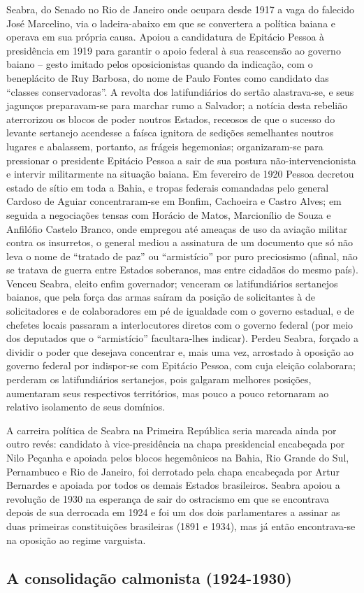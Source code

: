 Seabra, do Senado no Rio de Janeiro onde ocupara desde 1917 a vaga do falecido José Marcelino, via o ladeira-abaixo em que se convertera a política baiana e operava em sua própria causa. Apoiou a candidatura de Epitácio Pessoa à presidência em 1919 para garantir o apoio federal à sua reascensão ao governo baiano -- gesto imitado pelos oposicionistas quando da indicação, com o beneplácito de Ruy Barbosa, do nome de Paulo Fontes como candidato das ``classes conservadoras''. A revolta dos latifundiários do sertão alastrava-se, e seus jagunços preparavam-se para marchar rumo a Salvador; a notícia desta rebelião aterrorizou os blocos de poder noutros Estados, receosos de que o sucesso do levante sertanejo acendesse a faísca ignitora de sedições semelhantes noutros lugares e abalassem, portanto, as frágeis hegemonias; organizaram-se para pressionar o presidente Epitácio Pessoa a sair de sua postura não-intervencionista e intervir militarmente na situação baiana. Em fevereiro de 1920 Pessoa decretou estado de sítio em toda a Bahia, e tropas federais comandadas pelo general Cardoso de Aguiar concentraram-se em Bonfim, Cachoeira e Castro Alves; em seguida a negociações tensas com Horácio de Matos, Marcionílio de Souza e Anfilófio Castelo Branco, onde empregou até ameaças de uso da aviação militar contra os insurretos, o general mediou a assinatura de um documento que só não leva o nome de ``tratado de paz'' ou ``armistício'' por puro preciosismo (afinal, não se tratava de guerra entre Estados soberanos, mas entre cidadãos do mesmo país). Venceu Seabra, eleito enfim governador; venceram os latifundiários sertanejos baianos, que pela força das armas saíram da posição de solicitantes à de solicitadores e de colaboradores em pé de igualdade com o governo estadual, e de chefetes locais passaram a interlocutores diretos com o governo federal (por meio dos deputados que o ``armistício'' facultara-lhes indicar). Perdeu Seabra, forçado a dividir o poder que desejava concentrar e, mais uma vez, arrostado à oposição ao governo federal por indispor-se com Epitácio Pessoa, com cuja eleição colaborara; perderam os latifundiários sertanejos, pois galgaram melhores posições, aumentaram seus respectivos territórios, mas pouco a pouco retornaram ao relativo isolamento de seus domínios.




A carreira política de Seabra na Primeira República seria marcada ainda por outro revés: candidato à vice-presidência na chapa presidencial encabeçada por Nilo Peçanha e apoiada pelos blocos hegemônicos na Bahia, Rio Grande do Sul, Pernambuco e Rio de Janeiro, foi derrotado pela chapa encabeçada por Artur Bernardes e apoiada por todos os demais Estados brasileiros. Seabra apoiou a revolução de 1930 na esperança de sair do ostracismo em que se encontrava depois de sua derrocada em 1924 e foi um dos dois parlamentares a assinar as duas primeiras constituições brasileiras (1891 e 1934), mas já então encontrava-se na oposição ao regime varguista.

\subsection{A consolidação calmonista (1924-1930)}